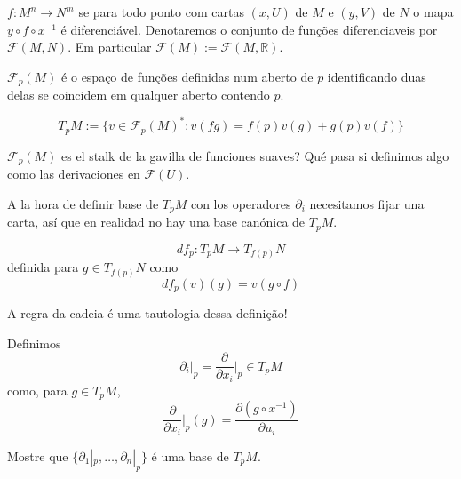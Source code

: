 \begin{defn}\leavevmode
\(f:M^n \to N^m\) se para todo ponto com cartas \((x,U)\) de  \(M\) e \((y,V)\) de \(N\) o mapa \(y \circ f \circ x^{-1}\) é diferenciável. Denotaremos o conjunto de funções diferenciaveis por \(\mathcal{F}(M,N)\). Em particular \(\mathcal{F}(M):=\mathcal{F}(M,\mathbb{R})\).

\end{defn}

\begin{defn}\leavevmode
\(\mathcal{F}_p(M)\) é o espaço de funções definidas num aberto de \(p\) identificando duas delas se coincidem em qualquer aberto contendo \(p\).

\[T_pM:=\{v \in \mathcal{F}_p(M)^*:v(fg)=f(p)v(g)+g(p)v(f)\}\]
\end{defn}

\begin{question}\leavevmode
\(\mathcal{F}_p(M)\) es el stalk de la gavilla de funciones suaves? Qué pasa si definimos algo como las derivaciones en \(\mathcal{F}(U)\).

A la hora de definir base de \(T_pM\) con los operadores \(\partial_i\) necesitamos fijar una carta, así que en realidad no hay una base canónica de \(T_pM\).
\end{question}

\begin{defn}\leavevmode
\[df_p:T_pM \to T_{f(p)}N\]
definida para \(g \in T_{f(p)}N\) como
\[df_p(v)(g)=v(g \circ f)\]
\end{defn}

\begin{remark}\leavevmode
A regra da cadeia é uma tautologia dessa definição!
\end{remark}

\begin{defn}\leavevmode
Definimos
\[\partial_i |_{p}=\frac{\partial }{\partial x_i}\Big|_{p}\in T_pM\]
como, para \(g \in T_pM\),
\[\frac{\partial }{\partial x_i}\Big|_{p}(g)=\frac{\partial (g \circ x^{-1})}{\partial u_i}\]
\end{defn}
\begin{exercise}\leavevmode
Mostre que \(\{\partial_1|_{p},\ldots, \partial_n|_{p}\}\) é uma base de \(T_pM\).
\end{exercise}

